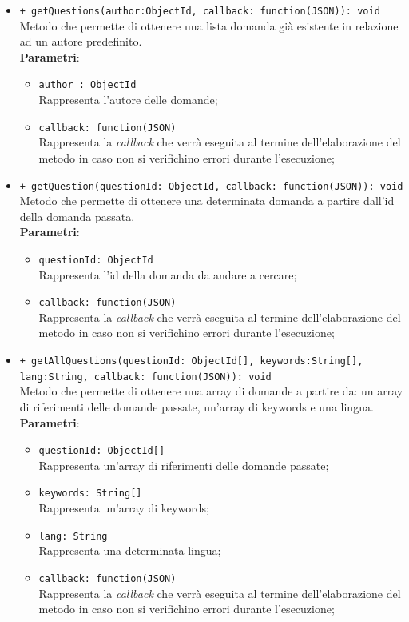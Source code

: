 \begin{itemize}
\begin{itemize}
\begin{itemize}
		\end{itemize}
	\item \texttt{+ getQuestions(author:ObjectId, callback: function(JSON)): void} \\
	Metodo che permette di ottenere una lista domanda già esistente in relazione ad un autore predefinito. \\
		\textbf{Parametri}:
		\begin{itemize}
			\item \texttt{author : ObjectId} \\
			Rappresenta l'autore delle domande;
			\item \texttt{callback: function(JSON)} \\
			Rappresenta la \textit{callback} che verrà eseguita al termine dell'elaborazione del metodo in caso non si verifichino errori durante l'esecuzione;
		\end{itemize}
	\item \texttt{+ getQuestion(questionId: ObjectId, callback: function(JSON)): void} \\
	Metodo che permette di ottenere una determinata domanda a partire dall'id della domanda passata. \\
			\textbf{Parametri}:
			\begin{itemize}
				\item \texttt{questionId: ObjectId} \\
				Rappresenta l'id della domanda da andare a cercare;
				\item \texttt{callback: function(JSON)} \\
				Rappresenta la \textit{callback} che verrà eseguita al termine dell'elaborazione del metodo in caso non si verifichino errori durante l'esecuzione;
			\end{itemize}	
			
	\item \texttt{+ getAllQuestions(questionId: ObjectId[], keywords:String[], lang:String, callback: function(JSON)): void} \\
	Metodo che permette di ottenere una array di domande a partire da: un array di riferimenti delle domande passate, un'array di keywords e una lingua. \\
		\textbf{Parametri}:
		\begin{itemize}
			\item \texttt{questionId: ObjectId[]} \\
			Rappresenta un'array di riferimenti delle domande passate;
			\item \texttt{keywords: String[]} \\
			Rappresenta un'array di keywords;
			\item \texttt{lang: String} \\
			Rappresenta una determinata lingua;
			\item \texttt{callback: function(JSON)} \\
			Rappresenta la \textit{callback} che verrà eseguita al termine dell'elaborazione del metodo in caso non si verifichino errori durante l'esecuzione;
		\end{itemize}	
		

\end{itemize}
\end{itemize}
